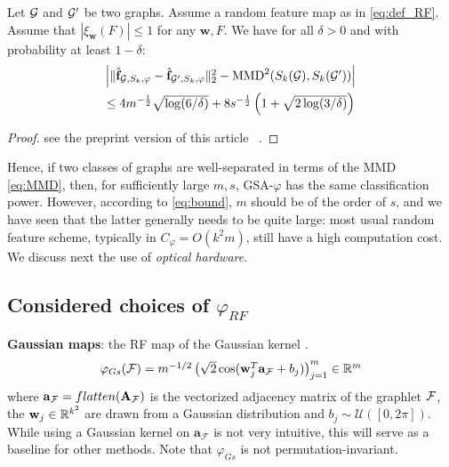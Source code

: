 \documentclass{article}
\begin{document}

\begin{theorem}\label{theorem:concentration}
Let $\mathcal{G}$ and $\mathcal{G}'$ be two graphs. %
Assume a random feature map as in \eqref{eq:def_RF}. Assume that $|\xi_\mathbf{w}(F)| \leq 1$ for any $\mathbf{w},F$.
We have for all $\delta>0$ and with probability at least $1-\delta$:
\begin{multline}\label{eq:bound}
\mathsmaller{
 \Big|\|\hat{\mathbf{f}}_{\G,S_k,\varphi} - \hat{\mathbf{f}}_{\G',S_k,\varphi} \|_2^2 - \textup{MMD}^2(S_k(\G),S_k(\G')) \Big| } \\
 \mathsmaller{ \leq 4 m^{-\frac12} \sqrt{\log (6/\delta)} + 8s^{-\frac12} \left(1+\sqrt{2\log(3/\delta)}\right)}
\end{multline}
\end{theorem}
\begin{proof}
	see the preprint version of this article ~\cite{ghanem2020fast}.
\end{proof}
Hence, if two classes of graphs are well-separated in terms of the MMD \eqref{eq:MMD}, then, for sufficiently large $m,s$, GSA-$\varphi$ has the same classification power. However, according to \eqref{eq:bound}, $m$ should be of the order of $s$, and we have seen that the latter generally needs to be quite large:  most usual random feature scheme, typically in $C_\varphi =O(k^2 m)$, still have a high computation cost. We discuss next the use of \emph{optical hardware}.

\subsection{Considered choices of $\varphi_{RF}$}
\label{sec:phi_choices}
\textbf{Gaussian maps}: the RF map of the Gaussian kernel \cite{rahimi2008random}. 
\begin{equation}
\label{eq:Gaussian_map}
 \mathsmaller{\varphi_{Gs}(\F) = m^{-1/2} \left( \sqrt{2} \cos(\mathbf{w}_j^T\mathbf{a}_\F+b_j) \right)_{j=1}^m \in \mathbb{R}^m}
\end{equation}
where $\mathbf{a}_{\mathcal{F}}=flatten(\mathbf{A}_{\mathcal{F}})$ is the vectorized adjacency matrix of the graphlet $\mathcal{F}$, 
the $\mathbf{w}_j\in \mathbb{R}^{k^2}$ are drawn from a Gaussian distribution and $b_j \sim \mathcal{U}([0, 2\pi])$. While using a Gaussian kernel on $\mathbf{a}_\mathcal{F}$ is not very intuitive, this will serve as a baseline for other methods. Note that $\varphi_{Gs}$ is not permutation-invariant.
\end{document}
